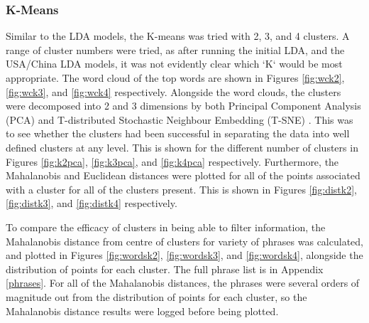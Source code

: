 \subsubsection{K-Means}
Similar to the LDA models, the K-means was tried with 2, 3, and 4 clusters. A range of cluster numbers were tried, as after running the initial LDA, and the USA/China LDA models, it was not evidently clear which `K` would be most appropriate. The word cloud of the top words are shown in Figures \ref{fig:wck2}, \ref{fig:wck3}, and \ref{fig:wck4} respectively. Alongside the word clouds, the clusters were decomposed into 2 and 3 dimensions by both Principal Component Analysis (PCA) and T-distributed Stochastic Neighbour Embedding (T-SNE) \cite{maaten2008visualizing}. This was to see whether the clusters had been successful in separating the data into well defined clusters at any level. This is shown for the different number of clusters in Figures \ref{fig:k2pca}, \ref{fig:k3pca}, and \ref{fig:k4pca} respectively. Furthermore, the Mahalanobis and Euclidean distances were plotted for all of the points associated with a cluster for all of the clusters present. This is shown in Figures \ref{fig:distk2}, \ref{fig:distk3}, and \ref{fig:distk4} respectively. 

To compare the efficacy of clusters in being able to filter information, the Mahalanobis distance from centre of clusters for variety of phrases was calculated, and plotted in Figures \ref{fig:wordsk2}, \ref{fig:wordsk3}, and \ref{fig:wordsk4}, alongside the distribution of points for each cluster. The full phrase list is in Appendix \ref{phrases}. For all of the Mahalanobis distances, the phrases were several orders of magnitude out from the distribution of points for each cluster, so the Mahalanobis distance results were logged before being plotted.  
